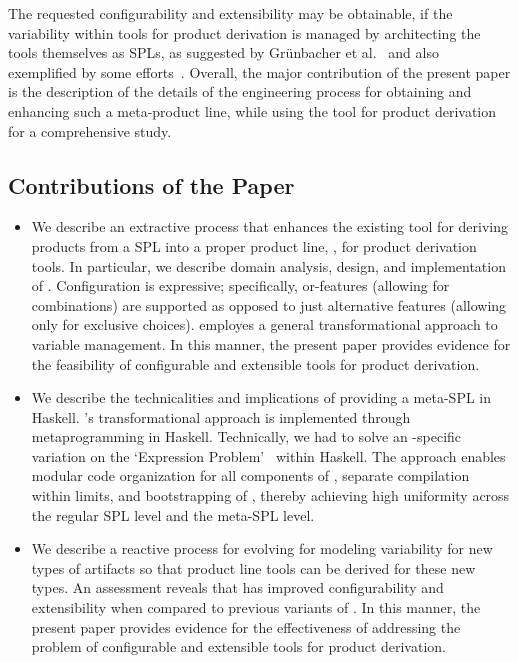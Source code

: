 

The requested configurability and extensibility may be obtainable, if the variability within tools for product derivation is managed by architecting the tools themselves as SPLs, as suggested by Gr{\"u}nbacher et al.~\cite{grunbacher:2008} and also exemplified by some efforts~\cite{grunbacher:2011,batory-ahead-bootstrap}. Overall, the major contribution of the present paper is the description of the details of the engineering process for obtaining and enhancing such a meta-product line, while using the \hp{} tool for product derivation for a comprehensive study.


\subsection*{Contributions of the Paper}

\begin{itemize}

\item We describe an extractive process that enhances the existing tool \hp{} for deriving products from a SPL into a proper product line, \hpl, for product derivation tools. In particular, we describe domain analysis, design, and implementation of \hpl. Configuration is expressive; specifically, or-features (allowing for combinations) are supported as opposed to just alternative features (allowing only for exclusive choices). \hpl{} employes a general transformational approach to variable management. In this manner, the present paper provides evidence for the feasibility of configurable and extensible tools for product derivation.

\item We describe the technicalities and implications of providing a meta-SPL in Haskell. \hpl's transformational approach is implemented through metaprogramming in Haskell. Technically, we had to solve an \hp-specific variation on the `Expression Problem'~\cite{Wadler98,Lopez-HerrejonBC05} within Haskell. The approach enables modular code organization for all components of \hpl, separate compilation within limits, and bootstrapping of \hpl, thereby achieving high uniformity across the regular SPL level and the meta-SPL level.

\item We describe a reactive process for evolving \hpl{} for modeling variability for new types of artifacts so that product line tools can be derived for these new types. An assessment reveals that \hpl{} has improved configurability and extensibility when compared to previous variants of \hp. In this manner, the present paper provides evidence for the effectiveness of addressing the problem of configurable and extensible tools for product derivation.

\end{itemize}

